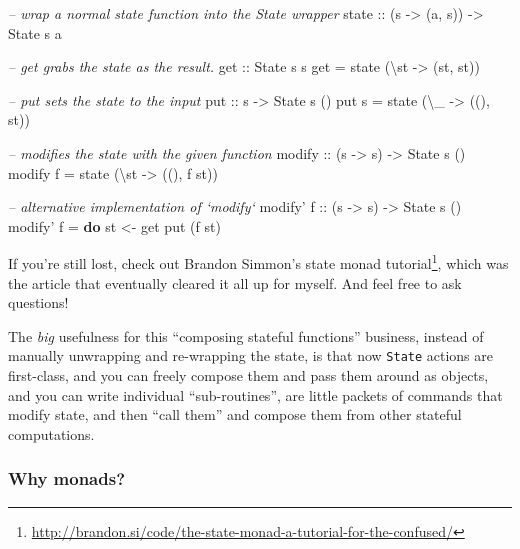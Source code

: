 \documentclass[]{article}
\newenvironment{Shaded}{}{}
\newcommand{\KeywordTok}[1]{\textcolor[rgb]{0.00,0.44,0.13}{\textbf{{#1}}}}
\newcommand{\DataTypeTok}[1]{\textcolor[rgb]{0.56,0.13,0.00}{{#1}}}
\newcommand{\CommentTok}[1]{\textcolor[rgb]{0.38,0.63,0.69}{\textit{{#1}}}}
\newcommand{\OtherTok}[1]{\textcolor[rgb]{0.00,0.44,0.13}{{#1}}}
\newcommand{\FunctionTok}[1]{\textcolor[rgb]{0.02,0.16,0.49}{{#1}}}
\newcommand{\NormalTok}[1]{{#1}}
\renewcommand{\href}[2]{#2\footnote{\url{#1}}}
\begin{document}
\begin{Shaded}
\begin{Highlighting}[]
\CommentTok{-- wrap a normal state function into the State wrapper}
\OtherTok{state ::} \NormalTok{(s }\OtherTok{->} \NormalTok{(a, s)) }\OtherTok{->} \DataTypeTok{State} \NormalTok{s a}

\CommentTok{-- get grabs the state as the result.}
\OtherTok{get ::} \DataTypeTok{State} \NormalTok{s s}
\NormalTok{get }\FunctionTok{=} \NormalTok{state (\textbackslash{}st }\OtherTok{->} \NormalTok{(st, st))}

\CommentTok{-- put sets the state to the input}
\OtherTok{put ::} \NormalTok{s }\OtherTok{->} \DataTypeTok{State} \NormalTok{s ()}
\NormalTok{put s }\FunctionTok{=} \NormalTok{state (\textbackslash{}_ }\OtherTok{->} \NormalTok{((), st))}

\CommentTok{-- modifies the state with the given function}
\OtherTok{modify ::} \NormalTok{(s }\OtherTok{->} \NormalTok{s) }\OtherTok{->} \DataTypeTok{State} \NormalTok{s ()}
\NormalTok{modify f }\FunctionTok{=} \NormalTok{state (\textbackslash{}st }\OtherTok{->} \NormalTok{((), f st))}

\CommentTok{-- alternative implementation of `modify`}
\NormalTok{modify'}\OtherTok{ f ::} \NormalTok{(s }\OtherTok{->} \NormalTok{s) }\OtherTok{->} \DataTypeTok{State} \NormalTok{s ()}
\NormalTok{modify' f }\FunctionTok{=} \KeywordTok{do}
    \NormalTok{st }\OtherTok{<-} \NormalTok{get}
    \NormalTok{put (f st)}
\end{Highlighting}
\end{Shaded}

If you're still lost, check out Brandon Simmon's
\href{http://brandon.si/code/the-state-monad-a-tutorial-for-the-confused/}{state
monad tutorial}, which was the article that eventually cleared it all up
for myself. And feel free to ask questions!

The \emph{big} usefulness for this ``composing stateful functions''
business, instead of manually unwrapping and re-wrapping the state, is
that now \texttt{State} actions are first-class, and you can freely
compose them and pass them around as objects, and you can write
individual ``sub-routines'', are little packets of commands that modify
state, and then ``call them'' and compose them from other stateful
computations.

\subsubsection{Why monads?}\label{why-monads}
\end{document}
